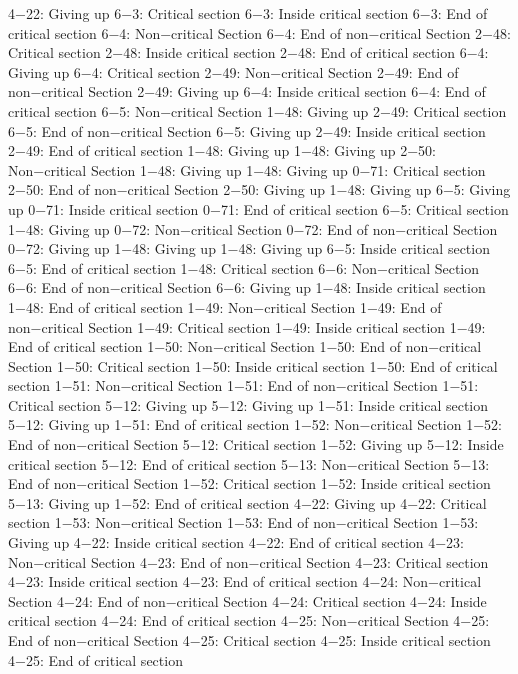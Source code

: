 4−22: Giving up
6−3: Critical section
6−3: Inside critical section
6−3: End of critical section
6−4: Non−critical Section
6−4: End of non−critical Section
2−48: Critical section
2−48: Inside critical section
2−48: End of critical section
6−4: Giving up
6−4: Critical section
2−49: Non−critical Section
2−49: End of non−critical Section
2−49: Giving up
6−4: Inside critical section
6−4: End of critical section
6−5: Non−critical Section
1−48: Giving up
2−49: Critical section
6−5: End of non−critical Section
6−5: Giving up
2−49: Inside critical section
2−49: End of critical section
1−48: Giving up
1−48: Giving up
2−50: Non−critical Section
1−48: Giving up
1−48: Giving up
0−71: Critical section
2−50: End of non−critical Section
2−50: Giving up
1−48: Giving up
6−5: Giving up
0−71: Inside critical section
0−71: End of critical section
6−5: Critical section
1−48: Giving up
0−72: Non−critical Section
0−72: End of non−critical Section
0−72: Giving up
1−48: Giving up
1−48: Giving up
6−5: Inside critical section
6−5: End of critical section
1−48: Critical section
6−6: Non−critical Section
6−6: End of non−critical Section
6−6: Giving up
1−48: Inside critical section
1−48: End of critical section
1−49: Non−critical Section
1−49: End of non−critical Section
1−49: Critical section
1−49: Inside critical section
1−49: End of critical section
1−50: Non−critical Section
1−50: End of non−critical Section
1−50: Critical section
1−50: Inside critical section
1−50: End of critical section
1−51: Non−critical Section
1−51: End of non−critical Section
1−51: Critical section
5−12: Giving up
5−12: Giving up
1−51: Inside critical section
5−12: Giving up
1−51: End of critical section
1−52: Non−critical Section
1−52: End of non−critical Section
5−12: Critical section
1−52: Giving up
5−12: Inside critical section
5−12: End of critical section
5−13: Non−critical Section
5−13: End of non−critical Section
1−52: Critical section
1−52: Inside critical section
5−13: Giving up
1−52: End of critical section
4−22: Giving up
4−22: Critical section
1−53: Non−critical Section
1−53: End of non−critical Section
1−53: Giving up
4−22: Inside critical section
4−22: End of critical section
4−23: Non−critical Section
4−23: End of non−critical Section
4−23: Critical section
4−23: Inside critical section
4−23: End of critical section
4−24: Non−critical Section
4−24: End of non−critical Section
4−24: Critical section
4−24: Inside critical section
4−24: End of critical section
4−25: Non−critical Section
4−25: End of non−critical Section
4−25: Critical section
4−25: Inside critical section
4−25: End of critical section
